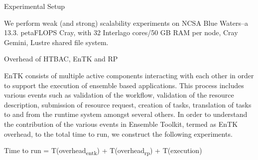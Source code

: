 
Experimental Setup

We perform weak (and strong) scalability experiments on NCSA Blue Waters--a 13.3. petaFLOPS Cray, with 32 Interlago cores/50 GB RAM per node, Cray Gemini, Lustre shared file system.

Overhead of HTBAC, EnTK and RP

EnTK consists of multiple active components interacting with each other in order to support the execution of ensemble based applications. This process includes various events such as validation of the workflow, validation of the resource description, submission of resource request, creation of tasks, translation of tasks to and from the runtime system amongst several others. In order to understand the contribution of the various events in Ensemble Toolkit, termed as EnTK overhead, to the total time to run, we construct the following experiments.

Time to run = T(overhead\textsubscript{entk}) + T(overhead\textsubscript{rp}) + T(execution)
